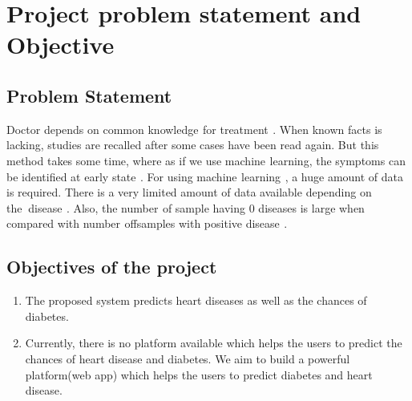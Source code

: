 \documentclass[oneside,12pt]{Classes/VTU}
\begin{document}
   
   
   	\section{Project problem statement and Objective}
   
   	\subsection{Problem Statement}
   	Doctor depends on common knowledge\tiny\textcolor{white}{s}\normalsize for treatment\tiny\textcolor{white}{s}\normalsize. When known facts is lacking, studies are recalled after some cases have been read again. But this method takes some time, where as if we use machine\tiny\textcolor{white}{s}\normalsize learning, the symptoms can be identified at early state\tiny\textcolor{white}{s}\normalsize.
   	For using machine\tiny\textcolor{white}{s}\normalsize learning\tiny\textcolor{white}{s}\normalsize, a huge amount of data is required. There is a very limited amount of data available depending on the\tiny\textcolor{white}{n}\normalsize disease\tiny\textcolor{white}{s}\normalsize. Also, the number\tiny\textcolor{white}{s}\normalsize of sample having 0 diseases is large when compared with number\tiny\textcolor{white}{s}\normalsize of\tiny\textcolor{white}{f}\normalsize samples with positive disease\tiny\textcolor{white}{s}\normalsize.
   	
   	\subsection{Objectives of the project}
   	\begin{enumerate}
   		\item The proposed system predicts heart diseases as well as the chances of diabetes.
   		\item Currently, there is no platform available which helps the users to predict the chances of heart disease and diabetes. We aim to build a powerful platform(web app) which helps the users to predict diabetes and heart disease.
   	\end{enumerate}
   
   
\end{document}
